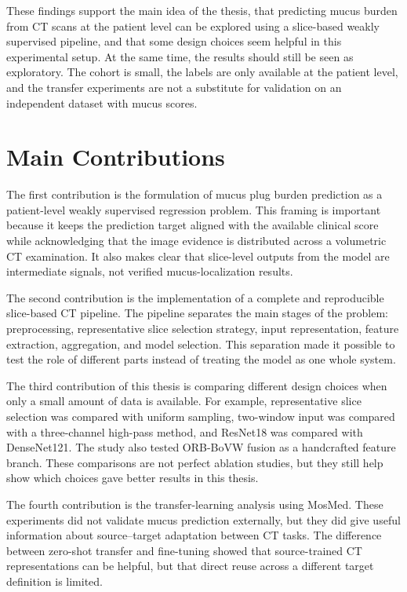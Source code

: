 These findings support the main idea of the thesis, that predicting mucus burden from CT scans at the patient level can be explored using a slice-based weakly supervised pipeline, and that some design choices seem helpful in this experimental setup. At the same time, the results should still be seen as exploratory. The cohort is small, the labels are only available at the patient level, and the transfer experiments are not a substitute for validation on an independent dataset with mucus scores.


\section{Main Contributions}
The first contribution is the formulation of mucus plug burden prediction as a patient-level weakly supervised regression problem. This framing is important because it keeps the prediction target aligned with the available clinical score while acknowledging that the image evidence is distributed across a volumetric CT examination. It also makes clear that slice-level outputs from the model are intermediate signals, not verified mucus-localization results.

The second contribution is the implementation of a complete and reproducible slice-based CT pipeline. The pipeline separates the main stages of the problem: preprocessing, representative slice selection strategy, input representation, feature extraction, aggregation, and model selection. This separation made it possible to test the role of different parts instead of treating the model as one whole system.

The third contribution of this thesis is comparing different design choices when only a small amount of data is available. For example, representative slice selection was compared with uniform sampling, two-window input was compared with a three-channel high-pass method, and ResNet18 was compared with DenseNet121. The study also tested ORB-BoVW fusion as a handcrafted feature branch. These comparisons are not perfect ablation studies, but they still help show which choices gave better results in this thesis.

The fourth contribution is the transfer-learning analysis using MosMed. These experiments did not validate mucus prediction externally, but they did give useful information about source--target adaptation between CT tasks. The difference between zero-shot transfer and fine-tuning showed that source-trained CT representations can be helpful, but that direct reuse across a different target definition is limited.


